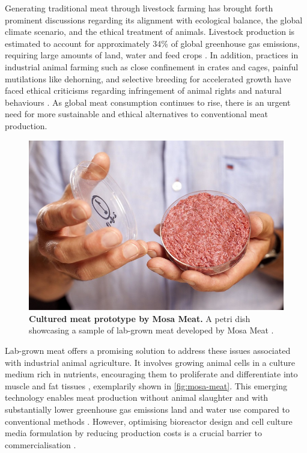 \documentclass[10pt]{article}
\begin{document}
\begin{sloppypar}
  Generating traditional meat through livestock farming has brought forth prominent discussions regarding its alignment with ecological balance, the global climate scenario, and the ethical treatment of animals. Livestock production is estimated to account for approximately 34\% of global greenhouse gas emissions, requiring large amounts of land, water and feed crops \citep{tuomisto_environmental_2011}. In addition, practices in industrial animal farming such as close confinement in crates and cages, painful mutilations like dehorning, and selective breeding for accelerated growth have faced ethical criticisms regarding infringement of animal rights and natural behaviours \citep{stephens_bringing_2018}. As global meat consumption continues to rise, there is an urgent need for more sustainable and ethical alternatives to conventional meat production.

  \begin{figure}[ht]
    \centering
    \includegraphics[width=\textwidth]{figures/mosa-meat.jpg}
    \caption[Lab-grown meat sample by Mosa Meat.]{\textbf{Cultured meat prototype by Mosa Meat.} A petri dish showcasing a sample of lab-grown meat developed by Mosa Meat \citep{meat_mosa_nodate}.}
    \label{fig:mosa-meat}
  \end{figure}

  Lab-grown meat offers a promising solution to address these issues associated with industrial animal agriculture. It involves growing animal cells in a culture medium rich in nutrients, encouraging them to proliferate and differentiate into muscle and fat tissues \citep{datar_possibilities_2010}, exemplarily shown in \autoref{fig:mosa-meat}. This emerging technology enables meat production without animal slaughter and with substantially lower greenhouse gas emissions land and water use compared to conventional methods \citep{tuomisto_environmental_2011}. However, optimising bioreactor design and cell culture media formulation by reducing production costs is a crucial barrier to commercialisation \citep{specht_opportunities_2018}.


\end{sloppypar}
\end{document}
